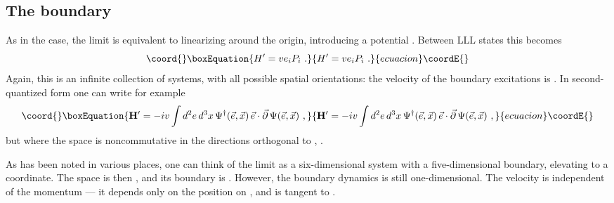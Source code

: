 \documentclass[a4paper,12pt]{article}
\providecommand{\R}{R}
\begin{document}
\subsection{The boundary}

As in the \coordHE{} case, the \coordHE{} limit is equivalent to linearizing
around the origin, introducing a potential \coordHE{}.  Between
LLL states this becomes
\begin{equation}\coord{}\boxEquation{
H' = v e_i P_i\ .
}{
H' = v e_i P_i\ .
}{ecuacion}\coordE{}\end{equation}
Again, this is an infinite collection of \coordHE{} systems, with all possible
spatial orientations: the velocity of the boundary excitations is \coordHE{}.
In second-quantized form one can write for example
\begin{equation}\coord{}\boxEquation{
{\bf H}' = - i v \int  d^2e\, d^3x\, \Psi^\dagger(\vec e,\vec x) \,\vec e \cdot
\vec \partial \,
\Psi(\vec e,\vec x)\ ,
}{
{\bf H}' = - i v \int  d^2e\, d^3x\, \Psi^\dagger(\vec e,\vec x) \,\vec e \cdot
\vec \partial \,
\Psi(\vec e,\vec x)\ ,
}{ecuacion}\coordE{}\end{equation}
but where the space is noncommutative in the directions orthogonal to \coordHE{},
\coordHE{}.

As has been noted in various places, one can think of the \coordHE{} limit
as a six-dimensional system with a five-dimensional boundary, elevating \coordHE{} to a coordinate.  The space is then
\myHighlight{$\R^4 \times S^2$}\coordHE{}, and its boundary is \myHighlight{$\R^3 \times S^2$}\coordHE{}.  However, the
boundary dynamics is still one-dimensional.  The velocity is independent of the
momentum --- it depends only on the position on \coordHE{}, and is tangent to
\myHighlight{$\R^3$}\coordHE{}.  
\end{document}
